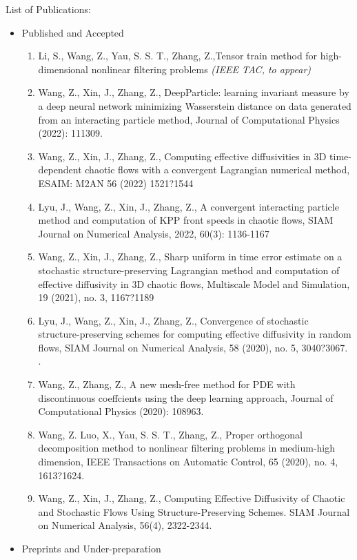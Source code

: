 \documentclass[12pt,a4paper]{article}
\newcounter{pubcounter}
\begin{document}
	List of Publications:
	\begin{itemize}
			\item{Published and Accepted}
		\begin{enumerate}
			\item{ Li, S., Wang, Z., Yau, S. S. T., Zhang, Z.,Tensor train method for high-dimensional nonlinear filtering problems  \textsl{(IEEE TAC, to appear)}}
			\item{Wang, Z., Xin, J., Zhang, Z., DeepParticle: learning invariant measure by a deep neural network minimizing Wasserstein distance on data generated from an interacting particle method, Journal of Computational Physics (2022): 111309.}
			\item{Wang, Z., Xin, J., Zhang, Z., Computing effective diffusivities in 3D time-dependent chaotic flows with a convergent Lagrangian numerical method, ESAIM: M2AN 56 (2022) 1521?1544}
			\item{ Lyu, J., Wang, Z., Xin, J., Zhang, Z., A convergent interacting particle method and computation of KPP front speeds in chaotic flows, SIAM Journal on Numerical Analysis, 2022, 60(3): 1136-1167}
			\item{Wang, Z., Xin, J., Zhang, Z., Sharp uniform in time error estimate on a stochastic structure-preserving Lagrangian method and computation of effective diffusivity in 3D chaotic flows, Multiscale Model and Simulation, 19 (2021), no. 3, 1167?1189}
			\item{ Lyu, J., Wang, Z., Xin, J., Zhang, Z., Convergence of stochastic structure-preserving schemes for computing effective diffusivity in random flows, SIAM Journal on Numerical Analysis, 58 (2020), no. 5, 3040?3067. .}
			\item{Wang, Z., Zhang, Z., A new mesh-free method for PDE with discontinuous coeffcients using the deep learning approach,  Journal of Computational Physics (2020): 108963.}
			\item{Wang, Z. Luo, X., Yau, S. S. T., Zhang, Z., Proper orthogonal decomposition method to nonlinear filtering problems in medium-high dimension, IEEE Transactions on Automatic Control, 65 (2020), no. 4, 1613?1624.}
			\item{Wang, Z., Xin, J., Zhang, Z.,  Computing Effective Diffusivity of Chaotic and Stochastic Flows Using Structure-Preserving Schemes. SIAM Journal on Numerical Analysis, 56(4), 2322-2344.}
			\setcounter{pubcounter}{\value{enumi}}
		\end{enumerate}
		\item{Preprints and Under-preparation}

\end{itemize}
\end{document}
